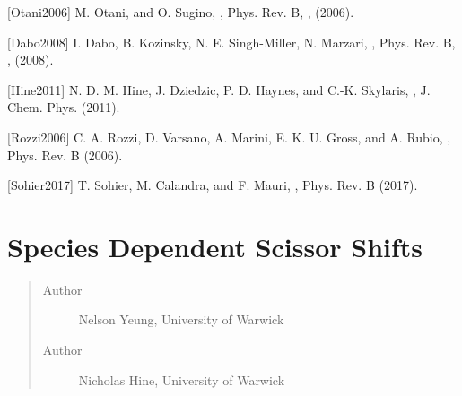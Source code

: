 \documentclass[letterpaper,10pt,english]{sphinxmanual}
\begin{document}
{[}Otani2006{]} M. Otani, and O. Sugino, , Phys. Rev. B, , (2006).

{[}Dabo2008{]} I. Dabo, B. Kozinsky, N. E. Singh-Miller, N. Marzari, , Phys. Rev. B, , (2008).

{[}Hine2011{]} N. D. M. Hine, J. Dziedzic, P. D. Haynes, and C.-K. Skylaris, , J. Chem. Phys.  (2011).

{[}Rozzi2006{]} C. A. Rozzi, D. Varsano, A. Marini, E. K. U. Gross, and A. Rubio, , Phys. Rev. B  (2006).

{[}Sohier2017{]} T. Sohier, M. Calandra, and F. Mauri, , Phys. Rev. B  (2017).


\section{Species Dependent Scissor Shifts}
\label{\detokenize{scissor_operator::doc}}\label{\detokenize{scissor_operator:species-dependent-scissor-shifts}}\begin{quote}\begin{description}
\item[{Author}] \leavevmode
Nelson Yeung, University of Warwick

\item[{Author}] \leavevmode
Nicholas Hine, University of Warwick

\end{description}\end{quote}
\end{document}
